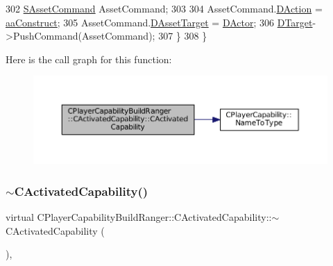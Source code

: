 \begin{DoxyCode}
302         \hyperlink{structSAssetCommand}{SAssetCommand} AssetCommand;
303 
304         AssetCommand.\hyperlink{structSAssetCommand_a8edd3b3d59a76d5514ba403bc8076a75}{DAction} = \hyperlink{GameDataTypes_8h_ab47668e651a3032cfb9c40ea2d60d670a7ef6b863f66dd7dcc95a199cd758ae1d}{aaConstruct};
305         AssetCommand.\hyperlink{structSAssetCommand_a3d9b43f6e59c386c48c41a65448a0c39}{DAssetTarget} = \hyperlink{classCActivatedPlayerCapability_a54ca944b47bff2718330639941d402b0}{DActor};
306         \hyperlink{classCActivatedPlayerCapability_a8a1cf50b6501bcfd55af0c935828e395}{DTarget}->PushCommand(AssetCommand);
307     \}
308 \}
\end{DoxyCode}
Here is the call graph for this function\+:
\nopagebreak
\begin{figure}[H]
\begin{center}
\leavevmode
\includegraphics[width=350pt]{classCPlayerCapabilityBuildRanger_1_1CActivatedCapability_a8b462671b0888c5374f4196b04d411d6_cgraph}
\end{center}
\end{figure}
\hypertarget{classCPlayerCapabilityBuildRanger_1_1CActivatedCapability_afd5d1ba5ad2b35faa67e4574627d46e1}{}\label{classCPlayerCapabilityBuildRanger_1_1CActivatedCapability_afd5d1ba5ad2b35faa67e4574627d46e1} 
\subsubsection{\texorpdfstring{$\sim$\+C\+Activated\+Capability()}{~CActivatedCapability()}}
{\footnotesize\ttfamily virtual C\+Player\+Capability\+Build\+Ranger\+::\+C\+Activated\+Capability\+::$\sim$\+C\+Activated\+Capability (\begin{DoxyParamCaption}{ }\end{DoxyParamCaption})\hspace{0.3cm}{\ttfamily [inline]}, {\ttfamily [virtual]}}



